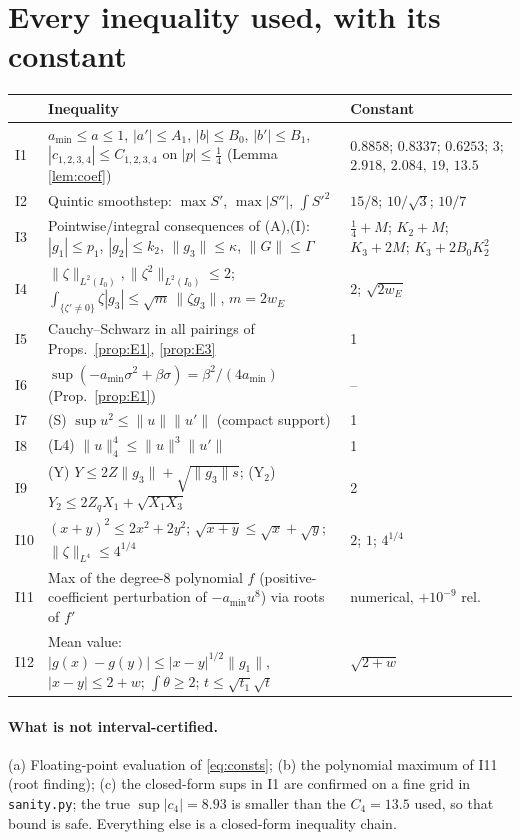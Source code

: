 \documentclass[11pt]{article}
\theoremstyle{remark}\newtheorem{remark}[theorem]{Remark}
\newcommand{\nrm}[1]{\lVert #1\rVert}
\newcommand{\Amin}{a_{\min}}
\begin{document}
\section{Every inequality used, with its constant}
\begin{center}\small\begin{tabular}{p{}p{}p{}}\toprule
 & Inequality & Constant\\\midrule
I1 & $\Amin\le a\le1$, $|a'|\le A_1$, $|b|\le B_0$, $|b'|\le B_1$, $|c_{1,2,3,4}|\le C_{1,2,3,4}$ on $|p|\le\frac14$ (Lemma \ref{lem:coef}) & $0.8858$; $0.8337$; $0.6253$; $3$; $2.918,\,2.084,\,19,\,13.5$\\
I2 & Quintic smoothstep: $\max S'$, $\max|S''|$, $\int S'^2$ & $15/8$; $10/\sqrt3$; $10/7$\\
I3 & Pointwise/integral consequences of (A),(I): $|g_1|\le p_1$, $|g_2|\le k_2$, $\nrm{g_3}\le\kappa$, $\nrm{G}\le\Gamma$ & $\frac14+M$; $K_2+M$; $K_3+2M$; $K_3+2B_0K_2^2$\\
I4 & $\nrm{\zeta}_{L^2(I_0)},\nrm{\zeta^2}_{L^2(I_0)}\le2$; $\int_{\{\zeta'\ne0\}}\zeta|g_3|\le\sqrt m\,\nrm{\zeta g_3}$, $m=2w_E$ & $2$; $\sqrt{2w_E}$\\
I5 & Cauchy--Schwarz in all pairings of Props.\ \ref{prop:E1}, \ref{prop:E3} & 1\\
I6 & $\sup(-\Amin\sigma^2+\beta\sigma)=\beta^2/(4\Amin)$ (Prop.~\ref{prop:E1}) & --\\
I7 & (S) $\sup u^2\le\nrm u\nrm{u'}$ (compact support) & 1\\
I8 & (L4) $\nrm u_4^4\le\nrm u^3\nrm{u'}$ & 1\\
I9 & (Y) $Y\le2Z\nrm{g_3}+\sqrt{\nrm{g_3}s}$; (Y$_2$) $Y_2\le2Z_qX_1+\sqrt{X_1X_3}$ & 2\\
I10 & $(x+y)^2\le2x^2+2y^2$; $\sqrt{x+y}\le\sqrt x+\sqrt y$; $\nrm{\zeta}_{L^4}\le4^{1/4}$ & $2$; $1$; $4^{1/4}$\\
I11 & Max of the degree-8 polynomial $f$ (positive-coefficient perturbation of $-\Amin u^8$) via roots of $f'$ & numerical, $+10^{-9}$ rel.\\
I12 & Mean value: $|g(x)-g(y)|\le|x-y|^{1/2}\nrm{g_1}$, $|x-y|\le2+w$; $\int\theta\ge2$; $t\le\sqrt{t_1}\sqrt t$ & $\sqrt{2+w}$\\\bottomrule
\end{tabular}\end{center}

\paragraph{What is not interval-certified.} (a) Floating-point evaluation of \eqref{eq:consts}; (b) the polynomial maximum of I11 (root finding); (c) the closed-form sups in I1 are confirmed on a fine grid in \texttt{sanity.py}; the true $\sup|c_4|=8.93$ is smaller than the $C_4=13.5$ used, so that bound is safe. Everything else is a closed-form inequality chain.
\end{document}
